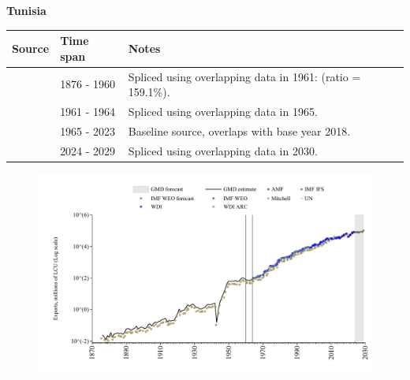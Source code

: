 \documentclass[12pt,a4paper,landscape]{article}
\begin{document}
\begin{adjustbox}{max totalsize={\paperwidth}{\paperheight},center}
\begin{minipage}[t][\textheight][t]{\textwidth}
\vspace*{0.5cm}
{}
\begin{center}
{\Large\bfseries Tunisia}
\end{center}
\vspace{0.5cm}
\begin{table}[H]
\centering
\small
\begin{tabular}{|l|l|l|}
\hline
\textbf{Source} & \textbf{Time span} & \textbf{Notes} \\
\hline
\rowcolor{white}\cite{Mitchell}& 1876 - 1960 &Spliced using overlapping data in 1961: (ratio = 159.1\%).\\
\rowcolor{lightgray}\cite{WDI_ARC}& 1961 - 1964 &Spliced using overlapping data in 1965.\\
\rowcolor{white}\cite{WDI}& 1965 - 2023 &Baseline source, overlaps with base year 2018.\\
\rowcolor{lightgray}\cite{IMF_WEO_forecast}& 2024 - 2029 &Spliced using overlapping data in 2030.\\
\hline
\end{tabular}
\end{table}
\begin{figure}[H]
\centering
\includegraphics[width=\textwidth,height=0.6\textheight,keepaspectratio]{graphs/TUN_exports.pdf}
\end{figure}
\end{minipage}
\end{adjustbox}
\end{document}
